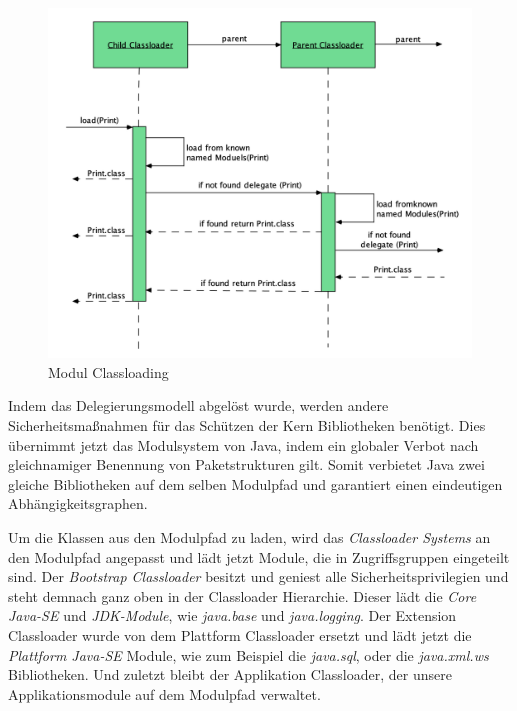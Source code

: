     \begin{figure}[h!]
      \centering{}
      \includegraphics[width=\textwidth]{material/images/module-classloading.png}
      \caption{Modul Classloading}
      \label{fig:mcl}
  \end{figure}

  Indem das Delegierungsmodell abgelöst wurde, werden andere Sicherheitsmaßnahmen für das Schützen der Kern Bibliotheken benötigt. Dies übernimmt jetzt das Modulsystem von Java, indem ein globaler Verbot nach gleichnamiger Benennung von Paketstrukturen gilt. Somit verbietet Java zwei gleiche Bibliotheken auf dem selben Modulpfad und garantiert einen eindeutigen Abhängigkeitsgraphen. \bigbreak

  Um die Klassen aus den Modulpfad zu laden, wird das \textit{Classloader Systems} an den Modulpfad angepasst und lädt jetzt Module, die in Zugriffsgruppen eingeteilt sind. Der \textit{Bootstrap Classloader} besitzt und geniest alle Sicherheitsprivilegien und steht demnach ganz oben in der Classloader Hierarchie. Dieser lädt die \textit{Core Java-SE} und \textit{JDK-Module}, wie \textit{java.base} und \textit{java.logging}. Der Extension Classloader wurde von dem Plattform Classloader ersetzt und lädt jetzt die \textit{Plattform Java-SE} Module, wie zum Beispiel die \textit{java.sql}, oder die \textit{java.xml.ws} Bibliotheken. Und zuletzt bleibt der Applikation Classloader, der unsere Applikationsmodule auf dem Modulpfad verwaltet. 

